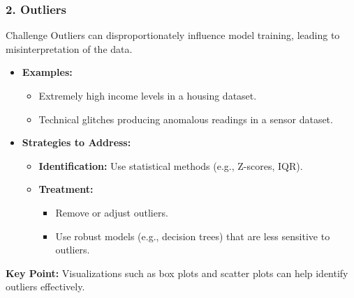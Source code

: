\documentclass[aspectratio=169]{beamer}
\begin{document}
\begin{frame}[fragile]
  \frametitle{2. Outliers}
  \begin{block}{Challenge}
    Outliers can disproportionately influence model training, leading to misinterpretation of the data.
  \end{block}

  \begin{itemize}
    \item \textbf{Examples:}
      \begin{itemize}
        \item Extremely high income levels in a housing dataset.
        \item Technical glitches producing anomalous readings in a sensor dataset.
      \end{itemize}

    \item \textbf{Strategies to Address:}
      \begin{itemize}
        \item \textbf{Identification:} Use statistical methods (e.g., Z-scores, IQR).
        \item \textbf{Treatment:}
        \begin{itemize}
          \item Remove or adjust outliers.
          \item Use robust models (e.g., decision trees) that are less sensitive to outliers.
        \end{itemize}
      \end{itemize}
  \end{itemize}

  \textbf{Key Point:} Visualizations such as box plots and scatter plots can help identify outliers effectively.
\end{frame}
\end{document}
